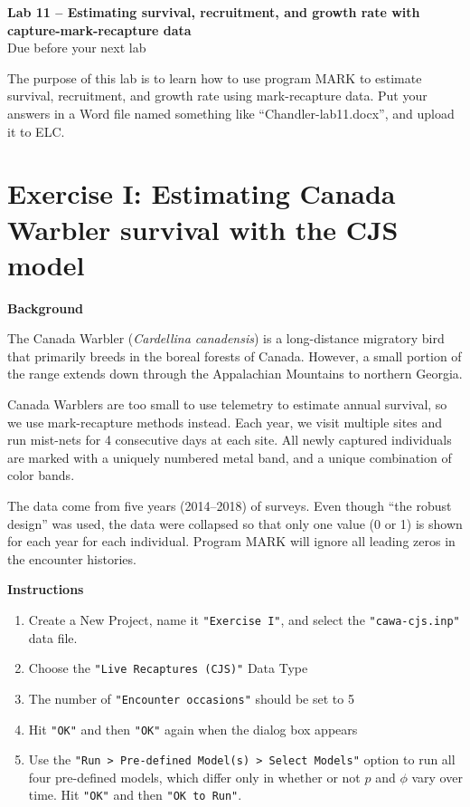 \documentclass[12pt]{article}
\begin{document}
{
  \Large
  \centering
  {\bf Lab 11 -- Estimating survival, recruitment, and growth rate
    with capture-mark-recapture data} \\
  Due before your next lab \par
}

\vspace{10pt}


The purpose of this lab is to learn how to use program MARK to
estimate survival, recruitment, and growth rate using mark-recapture
data. Put your answers in a Word file named something like
``Chandler-lab11.docx'', and upload it to ELC.

\vspace{-12pt}


\section*{\large Exercise I: Estimating Canada Warbler survival with
  the CJS model}

\vspace{-10pt}

{\bf Background}

The Canada Warbler ({\it Cardellina canadensis}) is a long-distance
migratory bird that primarily breeds in the boreal forests of
Canada. However, a small portion of the range extends down through the
Appalachian Mountains to northern Georgia.

Canada Warblers are too small to use telemetry to estimate annual
survival, so we use mark-recapture methods instead. Each year, we
visit multiple sites and run mist-nets for 4 consecutive days at each
site. All newly captured individuals are marked with a uniquely
numbered metal band, and a unique combination of color bands.

The data come from five years (2014--2018) of surveys. Even though
``the robust design'' was used, the data were collapsed so that only
one value (0 or 1) is shown for each year for each individual. Program
MARK will ignore all leading zeros in the encounter histories.

{\bf Instructions}

\begin{enumerate}
  \item Create a New Project, name it \verb+"Exercise I"+, and select
    the \verb+"cawa-cjs.inp"+ data file.
  \item Choose the \verb+"Live Recaptures (CJS)"+ Data Type
  \item The number of \verb+"Encounter occasions"+ should be set to 5
  \item Hit \verb+"OK"+ and then \verb+"OK"+ again when the dialog box
    appears
  \item Use the \verb+"Run > Pre-defined Model(s) > Select Models"+
    option to run all four pre-defined models, which differ only in
    whether or not $p$  and $\phi$ vary over time. Hit \verb+"OK"+ and
    then \verb+"OK to Run"+.
\end{enumerate}
\end{document}
